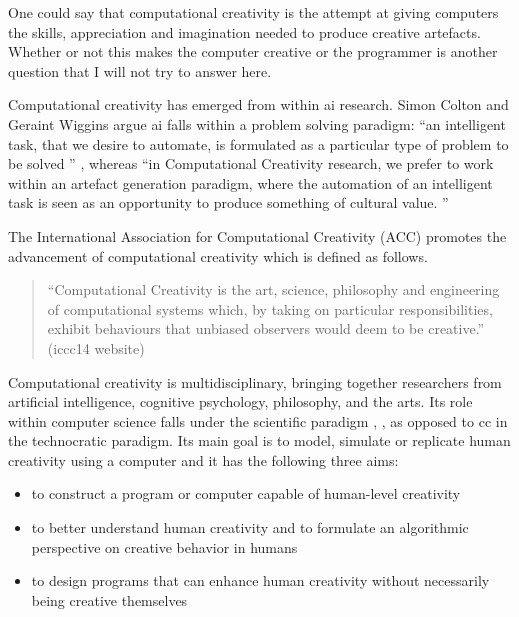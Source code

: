 \begin{draft}
  One could say that computational creativity is the attempt at giving computers the skills, appreciation and imagination needed to produce creative artefacts. Whether or not this makes the computer creative or the programmer is another question that I will not try to answer here.
\end{draft}

Computational creativity has emerged from within \gls{ai} research. Simon Colton and Geraint Wiggins argue \gls{ai} falls within a problem solving paradigm: ``an intelligent task, that we desire to automate, is formulated as a particular type of problem to be solved '' \autocite[p.2]{Colton2012}, whereas ``in Computational Creativity research, we prefer to work within an artefact generation paradigm, where the automation of an intelligent task is seen as an opportunity to produce something of cultural value. '' \autocite[p.2, my emphasis]{Colton2012}

The International Association for Computational Creativity (ACC)  promotes the advancement of computational creativity which is defined as follows.

\begin{quote}
  ``Computational Creativity is the art, science, philosophy and engineering of computational systems which, by taking on particular responsibilities, exhibit behaviours that unbiased observers would deem to be creative.'' (\gls{iccc}14 website)
\end{quote}

Computational creativity is multidisciplinary, bringing together researchers from artificial intelligence, cognitive psychology, philosophy, and the arts. Its role within computer science falls under the scientific paradigm \autocite[p.8]{Hugill2013}, \autocite[see also][]{Eden2007}, as opposed to \gls{cc} in the technocratic paradigm. Its main goal is to model, simulate or replicate human creativity using a computer and it has the following three aims:

\begin{itemize}
  \item to construct a program or computer capable of human-level creativity
  \item to better understand human creativity and to formulate an algorithmic perspective on creative behavior in humans
  \item to design programs that can enhance human creativity without necessarily being creative themselves
\end{itemize}


